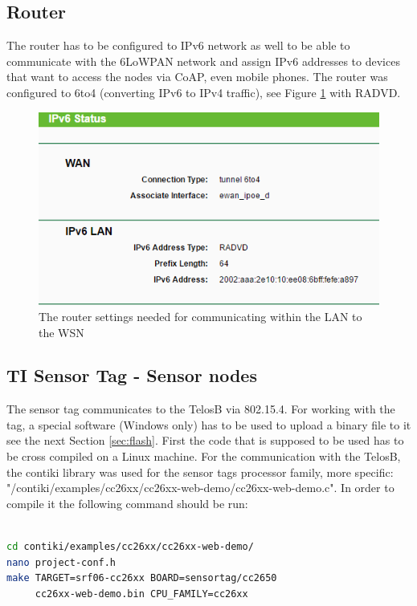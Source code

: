 \subsection{Router}

The router has to be configured to IPv6 network as well to be able to communicate with the 6LoWPAN network and assign IPv6 addresses to devices that want to access the nodes via CoAP, even mobile phones. The router was configured to 6to4 (converting IPv6 to IPv4 traffic), see Figure \ref{fig:routerSettings} with RADVD.

\begin{figure}[!h]
	\centering
		\includegraphics[width=1\linewidth]{routerSettings}
		\caption{The router settings needed for communicating within the LAN to the WSN}
		\label{fig:routerSettings}
\end{figure} 

\subsection{TI Sensor Tag - Sensor nodes}

The sensor tag communicates to the TelosB via 802.15.4. For working with the tag, a special software (Windows only) has to be used to upload a binary file to it see the next Section \ref{sec:flash}. First the code that is supposed to be used has to be cross compiled on a Linux machine. For the communication with the TelosB, the contiki library was used for the sensor tags processor family, more specific: "/contiki/examples/cc26xx/cc26xx-web-demo/cc26xx-web-demo.c". In order to compile it the following command should be run:

\begin{lstlisting}[basicstyle=\small,language=bash,caption={Cross compiling the web-demo to a binary file for the sensor tag}]

cd contiki/examples/cc26xx/cc26xx-web-demo/
nano project-conf.h
make TARGET=srf06-cc26xx BOARD=sensortag/cc2650
     cc26xx-web-demo.bin CPU_FAMILY=cc26xx
\end{lstlisting}

